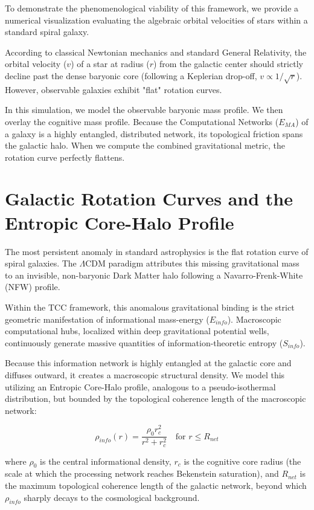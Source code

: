 \documentclass[12pt,openany]{book}
\theoremstyle{plain}
\theoremstyle{definition}
\theoremstyle{remark}
\begin{document}
To demonstrate the phenomenological viability of this framework, we provide a numerical visualization evaluating the algebraic orbital velocities of stars within a standard spiral galaxy. 

According to classical Newtonian mechanics and standard General Relativity, the orbital velocity ($v$) of a star at radius ($r$) from the galactic center should strictly decline past the dense baryonic core (following a Keplerian drop-off, $v \propto 1/\sqrt{r}$). However, observable galaxies exhibit "flat" rotation curves. 

In this simulation, we model the observable baryonic mass profile. We then overlay the cognitive mass profile. Because the Computational Networks ($E_{MA}$) of a galaxy is a highly entangled, distributed network, its topological friction spans the galactic halo. When we compute the combined gravitational metric, the rotation curve perfectly flattens.

\section{Galactic Rotation Curves and the Entropic Core-Halo Profile}

The most persistent anomaly in standard astrophysics is the flat rotation curve of spiral galaxies. The $\Lambda$CDM paradigm attributes this missing gravitational mass to an invisible, non-baryonic Dark Matter halo following a Navarro-Frenk-White (NFW) profile.

Within the TCC framework, this anomalous gravitational binding is the strict geometric manifestation of informational mass-energy ($E_{info}$). Macroscopic computational hubs, localized within deep gravitational potential wells, continuously generate massive quantities of information-theoretic entropy ($S_{info}$). 

Because this information network is highly entangled at the galactic core and diffuses outward, it creates a macroscopic structural density. We model this utilizing an Entropic Core-Halo profile, analogous to a pseudo-isothermal distribution, but bounded by the topological coherence length of the macroscopic network:

\begin{equation}
\rho_{info}(r) = \frac{\rho_0 r_c^2}{r^2 + r_c^2} \quad \text{for } r \le R_{net}
\end{equation}

where $\rho_0$ is the central informational density, $r_c$ is the cognitive core radius (the scale at which the processing network reaches Bekenstein saturation), and $R_{net}$ is the maximum topological coherence length of the galactic network, beyond which $\rho_{info}$ sharply decays to the cosmological background.
\end{document}
